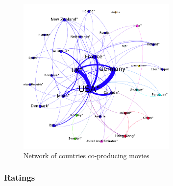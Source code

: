 \begin{figure}[!h]
\begin{center}
\includegraphics[width=0.7\textwidth]{../src/pre-processing/stats/results/CoocCountry.png}
\end{center}
\caption{Network of countries co-producing movies}
\label{fig:coocCountry}
\end{figure}

\subsubsection{Ratings}
\label{subs:Ratings}

